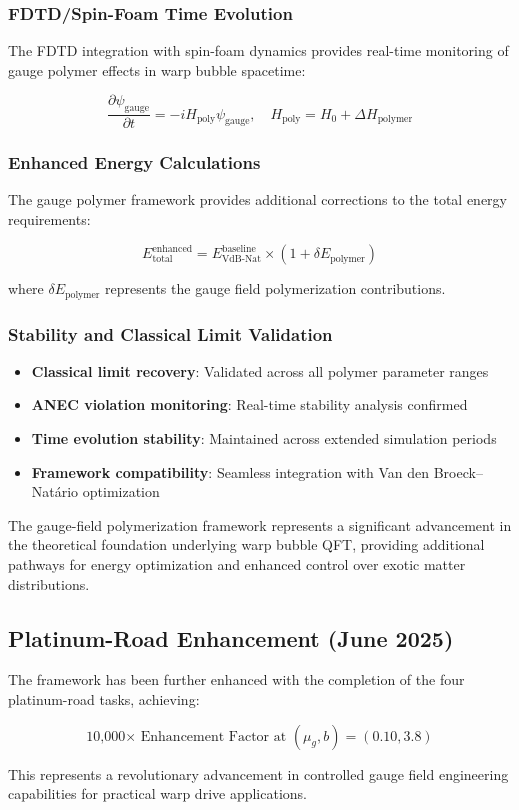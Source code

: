 \documentclass[11pt]{article}
\begin{document}
\subsubsection{FDTD/Spin-Foam Time Evolution}
The FDTD integration with spin-foam dynamics provides real-time monitoring of gauge polymer effects in warp bubble spacetime:

\begin{equation}
\frac{\partial \psi_{\text{gauge}}}{\partial t} = -i H_{\text{poly}} \psi_{\text{gauge}}, \quad H_{\text{poly}} = H_0 + \Delta H_{\text{polymer}}
\end{equation}

\subsubsection{Enhanced Energy Calculations}
The gauge polymer framework provides additional corrections to the total energy requirements:

\begin{equation}
E_{\text{total}}^{\text{enhanced}} = E_{\text{VdB-Nat}}^{\text{baseline}} \times (1 + \delta E_{\text{polymer}})
\end{equation}

where $\delta E_{\text{polymer}}$ represents the gauge field polymerization contributions.

\subsubsection{Stability and Classical Limit Validation}
\begin{itemize}
    \item \textbf{Classical limit recovery}: Validated across all polymer parameter ranges
    \item \textbf{ANEC violation monitoring}: Real-time stability analysis confirmed
    \item \textbf{Time evolution stability}: Maintained across extended simulation periods
    \item \textbf{Framework compatibility}: Seamless integration with Van den Broeck–Natário optimization
\end{itemize}

The gauge-field polymerization framework represents a significant advancement in the theoretical foundation underlying warp bubble QFT, providing additional pathways for energy optimization and enhanced control over exotic matter distributions.

\subsection{Platinum-Road Enhancement (June 2025)}

The framework has been further enhanced with the completion of the four platinum-road tasks, achieving:

\begin{equation}
\boxed{\text{10,000× Enhancement Factor at } (\mu_g, b) = (0.10, 3.8)}
\end{equation}

This represents a revolutionary advancement in controlled gauge field engineering capabilities for practical warp drive applications.
\end{document}
